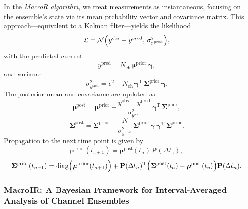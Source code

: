 \documentclass[pdflatex,sn-nature]{sn-jnl}%
\theoremstyle{thmstyleone}%
\theoremstyle{thmstyletwo}%
\theoremstyle{thmstylethree}%
\begin{document}
In the \textit{MacroR algorithm}, we treat measurements as instantaneous, focusing on the ensemble's state via its mean probability vector and covariance matrix. This approach—equivalent to a Kalman filter—yields the likelihood
\begin{equation}
\mathcal{L} = \mathcal{N}\Bigl( y^{\text{obs}} - y^{\text{pred}},\, \sigma^2_{y^{\text{pred}}} \Bigr),
\label{eq:macro_likelihood}
\end{equation}
with the predicted current
	\begin{equation}
	y^{\text{pred}} = N_{\text{ch}}\, \boldsymbol{\mu}^{\text{prior}}\, \boldsymbol{\gamma},
\label{eq:macro_predicted_y}
\end{equation}
and variance
\begin{equation}
\sigma^2_{y^{\text{pred}}} = \epsilon^2 + N_{\text{ch}}\, \boldsymbol{\gamma}^{\mathrm{T}}\, \boldsymbol{\Sigma}^{\text{prior}}\, \boldsymbol{\gamma}.
	\label{eq:macro_sigma_pred}
	\end{equation}
The posterior mean and covariance are updated as
\begin{equation}
\boldsymbol{\mu}^{\text{post}} = \boldsymbol{\mu}^{\text{prior}} + \frac{y^{\text{obs}} - y^{\text{pred}}}{\sigma^2_{y^{\text{pred}}}}\, \boldsymbol{\gamma}^{\mathrm{T}}\, \boldsymbol{\Sigma}^{\text{prior}},
\label{eq:macro_mean_posterior}
\end{equation}
	\begin{equation}
	\boldsymbol{\Sigma}^{\text{post}} = \boldsymbol{\Sigma}^{\text{prior}} - \frac{N}{\sigma^2_{y^{\text{pred}}}}\, \boldsymbol{\Sigma}^{\text{prior}}\, \boldsymbol{\gamma}\, \boldsymbol{\gamma}^{\mathrm{T}}\, \boldsymbol{\Sigma}^{\text{prior}}.
\label{eq:macro_cov_posterior}
\end{equation}
Propagation to the next time point is given by
\begin{equation}
\boldsymbol{\mu}^{\text{prior}}(t_{n+1}) = \boldsymbol{\mu}^{\text{post}}(t_n)\, \mathbf{P}(\Delta t_n),
	\label{eq:macro_mean_next_prior}
	\end{equation}
\begin{equation}
\boldsymbol{\Sigma}^{\text{prior}}(t_{n+1}) = \mathrm{diag}\Bigl(\boldsymbol{\mu}^{\text{prior}}(t_{n+1})\Bigr) + \mathbf{P}(\Delta t_n)^{\mathrm{T}} \Bigl( \boldsymbol{\Sigma}^{\text{post}}(t_n) - \boldsymbol{\mu}^{\text{post}}(t_n) \Bigr) \mathbf{P}(\Delta t_n).
\label{eq:macro_mean_next_cov}
\end{equation}
\subsubsection{MacroIR: A Bayesian Framework for Interval-Averaged Analysis of Channel Ensembles}
\end{document}
